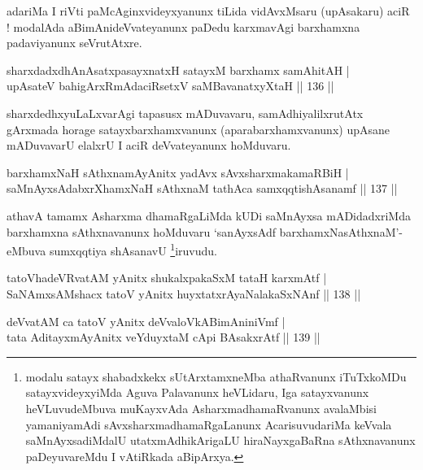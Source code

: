 \begin{artha}
adariMa I riVti paMcAginxvideyxyanunx tiLida vidAvxMsaru (upAsakaru)
aciR ! modalAda aBimAnideVvateyanunx paDedu karxmavAgi barxhamxna
padaviyanunx seVrutAtxre.
\end{artha}


\begin{shl}
sharxdadxdhAnAsatxpasayxnatxH satayxM barxhamx samAhitAH | \\
upAsateV bahigArxRmAdaciRsetxV saMBavanatxyXtaH \hfill|| 136 || 
\end{shl}

\begin{artha}
sharxdedhxyuLaLxvarAgi tapasusx mADuvavaru, samAdhiyalilxrutAtx
gArxmada horage satayxbarxhamxvanunx (aparabarxhamxvanunx) upAsane
mADuvavarU elalxrU I aciR deVvateyanunx hoMduvaru.
\end{artha}


\begin{shl}
barxhamxNaH sAthxnamAyAnitx yadAvx sAvxsharxmakamaRBiH | \\
saMnAyxsAdabxrXhamxNaH sAthxnaM tathAca samxqqtishAsanamf \hfill|| 137 || 
\end{shl}

\begin{artha}
athavA tamamx Asharxma dhamaRgaLiMda kUDi saMnAyxsa mADidadxriMda
barxhamxna sAthxnavanunx hoMduvaru `sanAyxsAdf barxhamxNasAthxnaM'- eMbuva sumxqqtiya
shAsanavU \footnote{modalu satayx shabadxkekx sUtArxtamxneMba
  athaRvanunx iTuTxkoMDu satayxvideyxyiMda Aguva Palavanunx heVLidaru,
Iga satayxvanunx heVLuvudeMbuva muKayxvAda AsharxmadhamaRvanunx
avalaMbisi yamaniyamAdi sAvxsharxmadhamaRgaLanunx AcarisuvudariMa
keVvala saMnAyxsadiMdalU utatxmAdhikArigaLU hiraNayxgaBaRna
sAthxnavanunx paDeyuvareMdu I vAtiRkada aBipArxya.}iruvudu.
\end{artha}



\begin{shl}
tatoV\s hadeVRvatAM yAnitx shukalxpakaSxM tataH karxmAtf | \\
SaNAmxsAMshacx tatoV yAnitx huyxtatxrAyaNalakaSxNAnf \hfill|| 138 || 
\end{shl}

\begin{shl}
deVvatAM ca tatoV yAnitx deVvaloVkABimAniniVmf | \\
tata AditayxmAyAnitx veYduyxtaM cApi BAsakxrAtf \hfill|| 139 || 
\end{shl}

